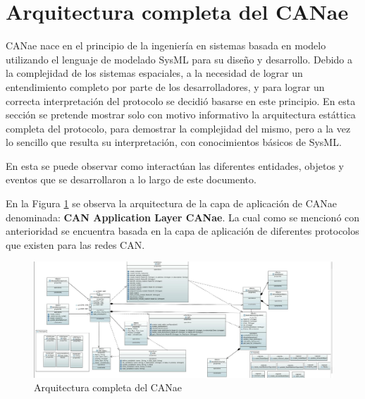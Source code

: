 \section{Arquitectura completa del CANae}
CANae nace en el principio de la ingeniería en sistemas basada en modelo
utilizando el lenguaje de modelado SysML para su diseño y desarrollo.
Debido a la complejidad de los sistemas espaciales, a la
necesidad de lograr un entendimiento completo por parte de los desarrolladores,
y para lograr un correcta interpretación del protocolo se decidió basarse en
este principio. En esta sección se pretende mostrar solo con motivo informativo
la arquitectura estáttica completa del protocolo, para demostrar la complejidad
del mismo, pero a la vez lo sencillo que resulta su interpretación, con
conocimientos básicos de SysML.

En esta se puede observar como interactúan las diferentes entidades, objetos y
eventos que se desarrollaron a lo largo de este documento.

En la Figura \ref{fig:Arq_CAN_App_Layer} se observa la arquitectura de la capa
de aplicación de CANae denominada: \textbf{CAN Application Layer CANae}. La cual
como se mencionó con anterioridad se encuentra basada en la capa de aplicación
de diferentes protocolos que existen para las redes CAN.

\begin{figure}
    \centering
    \includegraphics[scale=0.25]{images/Secciones/AppendixA/Complete_CANAppLayerCANae2.JPG}
    \caption{Arquitectura completa del CANae}
    \label{fig:Arq_CAN_App_Layer}
\end{figure}
